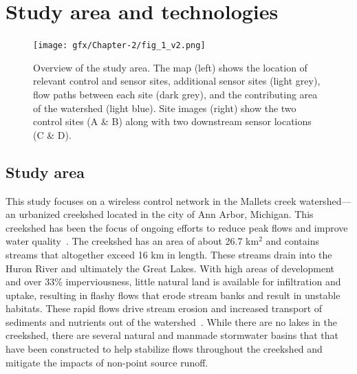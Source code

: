 \section{Study area and technologies}

\begin{figure}
\centering
\texttt{[image: gfx/Chapter-2/fig\_1\_v2.png]}
\caption{Overview of the study area. The map (left) shows the location of relevant control and sensor sites, additional sensor sites (light grey), flow paths between each site (dark grey), and the contributing area of the watershed (light blue). Site images (right) show the two control sites (A \& B) along with two downstream sensor locations (C \& D).
}\label{fig-ch2:fig1}
\end{figure}

\subsection{Study area}

This study focuses on a wireless control network in the Mallets creek watershed---an urbanized creekshed located in the city of Ann Arbor, Michigan. This creekshed has been the focus of ongoing efforts to reduce peak flows and improve water quality~\cite{HRWC_2011}.
The creekshed has an area of about 26.7 km$^2$ and contains streams that altogether exceed 16 km in length. These streams drain into the Huron River and ultimately the Great Lakes. With high areas of development and over 33\% imperviousness, little natural land is available for infiltration and uptake, resulting in flashy flows that erode stream banks and result in unstable habitats.
These rapid flows drive stream erosion and increased transport of sediments and nutrients out of the watershed~\cite{HRWC_2011}. 
While there are no lakes in the creekshed, there are several natural and manmade stormwater basins that that have been constructed to help stabilize flows throughout the creekshed and mitigate the impacts of non-point source runoff.

